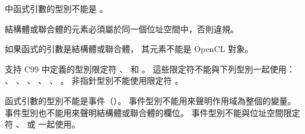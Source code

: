 \startitem
{}中函式引數的型別不能是 。
\stopitem

\startitem
結構體或聯合體的元素必須屬於同一個位址空間中，否則違規。
\stopitem

\startitem
如果函式的引數是結構體或聯合體，
其元素不能是 OpenCL 對象。
\stopitem

\startitem
支持 C99 中定義的型別限定符 、  和 。
這些限定符不能與下列型別一起使用：
 、 、 、
 、 、 。
非指針型別不能使用限定符 。
\stopitem

\startitem
{}函式引數的型別不能是事件（）。
事件型別不能用來聲明作用域為整個的變量。
事件型別也不能用來聲明結構體或聯合體的欄位。
事件型別不能與位址空間限定符
 、  或  一起使用。
\stopitem

\stopigBig

